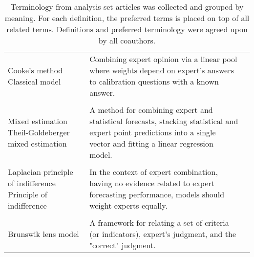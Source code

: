 \documentclass[preprint]{elsarticle}
\begin{document}
\begin{table*}[ht!]
\begin{tabular}{L{6cm} L{8cm} L{4cm}}
         Cooke's method\hspace{35mm}
         Classical model & Combining expert opinion via a linear pool where weights depend on expert's answers to calibration questions with a known answer. &
         \cite{cooke2014out,morales2017characterization,zio1996use,hanea2018value,hathout2016uncertainty,ISI:000391078100005,ISI:000296286100010,brito2012behavioral,hora2015calibration, ISI:000327676900001}\\ 
        \vspace{0.5mm}\\    
          
        Mixed estimation  \hspace{35mm}
        Theil-Goldeberger mixed estimation &  A method for combining expert and statistical forecasts, stacking statistical and expert point predictions into a single vector and fitting a linear regression model. & 
        \cite{alho1992estimating,shin2013robust}\\
        \vspace{0.5mm}\\
        
        Laplacian principle of indifference \hspace{12mm}
        Principle of indifference & In the context of expert combination, having no evidence related to expert forecasting performance, models should weight experts equally. & 
        \cite{ISI:000391078100005}\\
        \vspace{0.5mm}\\
        
        Brunswik lens model & 
        A framework for relating a set of criteria (or indicators), expert's judgment, and the "correct" judgment. & 
        \cite{seifert2013relative,franses2011averaging}\\
         \hline
    \end{tabular}
    \caption{ Terminology from analysis set articles was collected and grouped by meaning.
              For each definition, the preferred terms is placed on top of all related terms.
              Definitions and preferred terminology were agreed upon by all coauthors. \label{tbl.terms}}
\end{table*}
\end{document}
